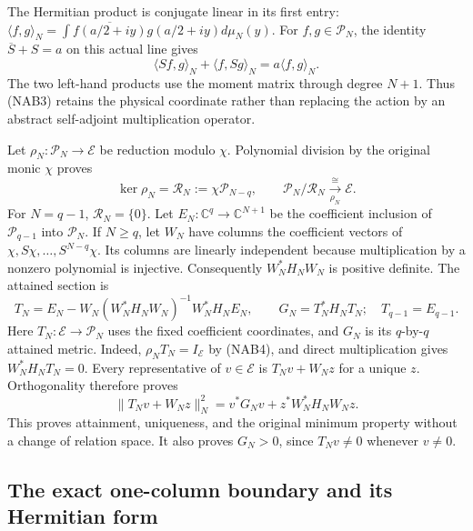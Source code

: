 The Hermitian product is conjugate linear in its first entry:
\(\langle f,g\rangle_N=\int\overline{f(a/2+iy)}g(a/2+iy)d\mu_N(y)\).
For \(f,g\in\mathcal P_N\), the identity
\(\overline S+S=a\) on this actual line gives
\begin{equation}
 \langle Sf,g\rangle_N+\langle f,Sg\rangle_N
       =a\langle f,g\rangle_N .
 \tag{NAB3}\label{eq:NAB3}
\end{equation}
The two left-hand products use the moment matrix through degree \(N+1\).
Thus (NAB3) retains the physical coordinate rather than replacing the
action by an abstract self-adjoint multiplication operator.

Let \(\rho_N:\mathcal P_N\longrightarrow\mathcal E\) be reduction modulo
\(\chi\).  Polynomial division by the original monic \(\chi\) proves
\begin{equation}
 \ker\rho_N=\mathcal R_N:=\chi\mathcal P_{N-q},\qquad
 \mathcal P_N/\mathcal R_N \xrightarrow[\rho_N]{\ \cong\ }\mathcal E .
 \tag{NAB4}\label{eq:NAB4}
\end{equation}
For \(N=q-1\), \(\mathcal R_N=\{0\}\).
Let \(E_N:\mathbb C^q\to\mathbb C^{N+1}\) be the coefficient inclusion of
\(\mathcal P_{q-1}\) into \(\mathcal P_N\).  If \(N\geq q\), let \(W_N\)
have columns the coefficient vectors of
\(\chi,S\chi,\ldots,S^{N-q}\chi\).  Its columns are linearly independent
because multiplication by a nonzero polynomial is injective.
Consequently \(W_N^*H_NW_N\) is positive definite.  The attained section is
\begin{equation}
 T_N=E_N-W_N(W_N^*H_NW_N)^{-1}W_N^*H_NE_N,\qquad
 G_N=T_N^*H_NT_N ;
 \quad T_{q-1}=E_{q-1}.
 \tag{NAB5}\label{eq:NAB5}
\end{equation}
Here \(T_N:\mathcal E\to\mathcal P_N\) uses the fixed coefficient
coordinates, and \(G_N\) is its \(q\)-by-\(q\) attained metric.
Indeed, \(\rho_NT_N=I_{\mathcal E}\) by (NAB4), and direct multiplication
gives \(W_N^*H_NT_N=0\).  Every representative of \(v\in\mathcal E\)
is \(T_Nv+W_Nz\) for a unique \(z\).  Orthogonality therefore proves
\[
 \|T_Nv+W_Nz\|_N^2
 =v^*G_Nv+z^*W_N^*H_NW_Nz.
\]
This proves attainment, uniqueness, and the original minimum property
without a change of relation space.  It also proves \(G_N>0\), since
\(T_Nv\ne0\) whenever \(v\ne0\).

\subsection{The exact one-column boundary and its Hermitian form}

